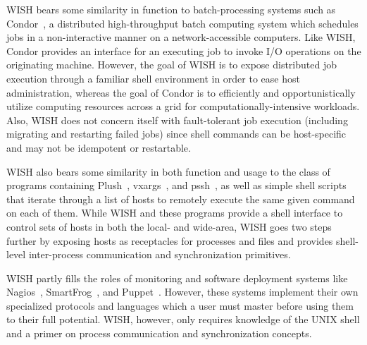  \label{sec:related}

WISH bears some similarity in function to batch-processing systems such as
Condor~\cite{Condor}, a distributed high-throughput batch computing system
which schedules jobs in a non-interactive manner on a network-accessible
computers.  Like WISH, Condor provides an interface for an executing job to
invoke I/O operations on the originating machine.  However, the goal of WISH
is to expose distributed job execution through a familiar shell environment in
order to ease host administration, whereas the goal of Condor is to
efficiently and opportunistically utilize computing resources across a grid
for computationally-intensive workloads.  Also, WISH does not concern itself
with fault-tolerant job execution (including migrating and restarting failed
jobs) since shell commands can be host-specific and may not be idempotent or
restartable.

WISH also bears some similarity in both function and usage to the class of
programs containing Plush~\cite{plush}, vxargs~\cite{vxargs}, and
pssh~\cite{parallel-ssh}, as well as simple shell scripts that iterate through
a list of hosts to remotely execute the same given command on each of them.
While WISH and these programs provide a shell interface to control sets of
hosts in both the local- and wide-area, WISH goes two steps further by
exposing hosts as receptacles for processes and files and provides shell-level
inter-process communication and synchronization primitives.

WISH partly fills the roles of monitoring and software deployment systems like
Nagios~\cite{nagios}, SmartFrog~\cite{smartfrog}, and Puppet~\cite{Puppet}.
However, these systems implement their own specialized protocols and languages
which a user must master before using them to their full potential.  WISH,
however, only requires knowledge of the UNIX shell and a primer on process
communication and synchronization concepts.



